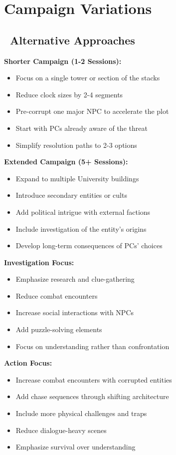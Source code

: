 \documentclass[11pt]{article}
\begin{document}
\section{Campaign Variations}

\subsection*{\faRandom\ Alternative Approaches}

\textbf{Shorter Campaign (1-2 Sessions):}
\begin{itemize}
    \item Focus on a single tower or section of the stacks
    \item Reduce clock sizes by 2-4 segments
    \item Pre-corrupt one major NPC to accelerate the plot
    \item Start with PCs already aware of the threat
    \item Simplify resolution paths to 2-3 options
\end{itemize}

\textbf{Extended Campaign (5+ Sessions):}
\begin{itemize}
    \item Expand to multiple University buildings
    \item Introduce secondary entities or cults
    \item Add political intrigue with external factions
    \item Include investigation of the entity's origins
    \item Develop long-term consequences of PCs' choices
\end{itemize}

\textbf{Investigation Focus:}
\begin{itemize}
    \item Emphasize research and clue-gathering
    \item Reduce combat encounters
    \item Increase social interactions with NPCs
    \item Add puzzle-solving elements
    \item Focus on understanding rather than confrontation
\end{itemize}

\textbf{Action Focus:}
\begin{itemize}
    \item Increase combat encounters with corrupted entities
    \item Add chase sequences through shifting architecture
    \item Include more physical challenges and traps
    \item Reduce dialogue-heavy scenes
    \item Emphasize survival over understanding
\end{itemize}
\end{document}
